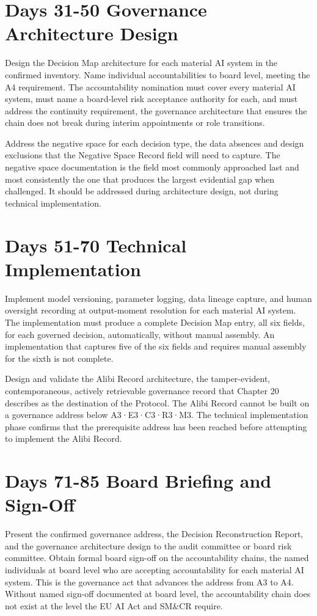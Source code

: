 \section{Days 31-50 Governance Architecture Design}

Design the Decision Map architecture for each material AI system in the confirmed inventory. Name individual accountabilities to board level, meeting the A4 requirement. The accountability nomination must cover every material AI system, must name a board-level risk acceptance authority for each, and must address the continuity requirement, the governance architecture that ensures the chain does not break during interim appointments or role transitions.

Address the negative space for each decision type, the data absences and design exclusions that the Negative Space Record field will need to capture. The negative space documentation is the field most commonly approached last and most consistently the one that produces the largest evidential gap when challenged. It should be addressed during architecture design, not during technical implementation.

\section{Days 51-70 Technical Implementation}

Implement model versioning, parameter logging, data lineage capture, and human oversight recording at output-moment resolution for each material AI system. The implementation must produce a complete Decision Map entry, all six fields, for each governed decision, automatically, without manual assembly. An implementation that captures five of the six fields and requires manual assembly for the sixth is not complete.

Design and validate the Alibi Record architecture, the tamper-evident, contemporaneous, actively retrievable governance record that Chapter 20 describes as the destination of the Protocol. The Alibi Record cannot be built on a governance address below A3·E3·C3·R3·M3. The technical implementation phase confirms that the prerequisite address has been reached before attempting to implement the Alibi Record.

\section{Days 71-85 Board Briefing and Sign-Off}

Present the confirmed governance address, the Decision Reconstruction Report, and the governance architecture design to the audit committee or board risk committee. Obtain formal board sign-off on the accountability chains, the named individuals at board level who are accepting accountability for each material AI system. This is the governance act that advances the address from A3 to A4. Without named sign-off documented at board level, the accountability chain does not exist at the level the EU AI Act and SM\&CR require.


